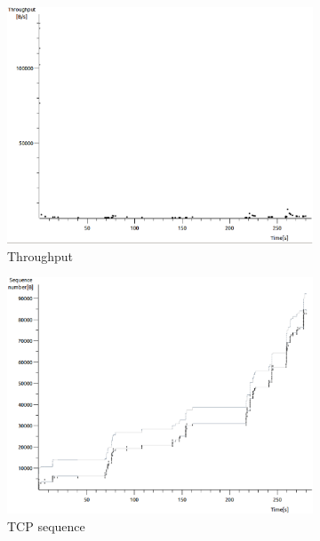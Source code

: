 \documentclass[conference,a4paper]{../../sty/IEEEtran}
\begin{document}
\begin{figure}
 \centering
 \begin{subfigure}[b]{0.2\textwidth}
  \includegraphics[width=\textwidth]{s5-2_th}
  \caption{Throughput}
 \end{subfigure}
 \begin{subfigure}[b]{0.2\textwidth}
  \includegraphics[width=\textwidth]{s5-2_seq}
  \caption{TCP sequence}
 \end{subfigure}
 \begin{subfigure}[b]{0.2\textwidth}

\end{subfigure}
\end{figure}
\end{document}
